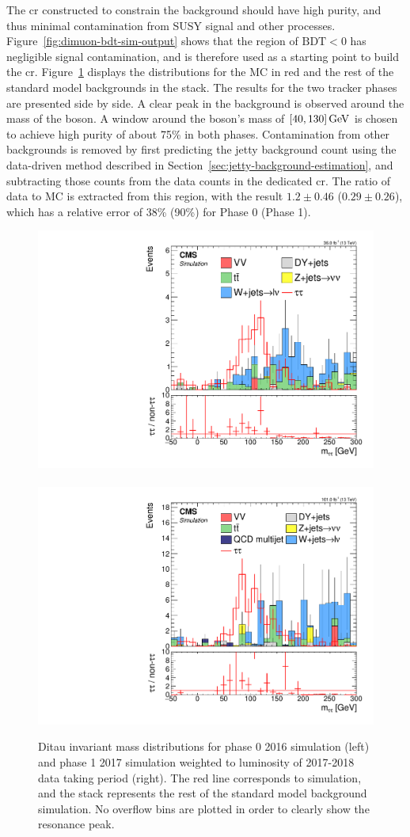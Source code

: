 The \gls{cr} constructed to constrain the \ztautau background should have high purity, and thus minimal contamination from SUSY signal and other processes. Figure~\ref{fig:dimuon-bdt-sim-output} shows that the region of $\text{BDT} < 0$ has negligible signal contamination, and is therefore used as a starting point to build the \tautau \gls{cr}. Figure~\ref{fig:mtautau-distributions} displays the \mtautau distributions for the \tautau MC in red and the rest of the standard model backgrounds in the stack. The results for the two tracker phases are presented side by side. A clear peak in the \tautau background is observed around the mass of the \PZ boson. A window around the \PZ boson's mass of $[40,130]\,\text{Ge\hspace{-.08em}V}$ is chosen to achieve high purity of about 75\% in both phases. Contamination from other backgrounds is removed by first predicting the jetty background count using the data-driven method described in Section~\ref{sec:jetty-background-estimation}, and subtracting those counts from the data counts in the \tautau dedicated \gls{cr}. The ratio of data to MC is extracted from this region, with the result $1.2\pm 0.46$ ($0.29\pm 0.26$), which has a relative error of 38\% (90\%) for Phase 0 (Phase 1).

\begin{figure}[!htb]
\centering
\includegraphics[width=0.48\linewidth]{plots/dilepton_muons_bg_isocr_scan_tautau_vs_no_tautau/bdt2_nmtautauCorrJetNoMultIso10Dr0.6.pdf} \,
\includegraphics[width=0.48\linewidth]{plots/dilepton_muons_bg_isocr_scan_tautau_vs_no_tautau_phase1/bdt_nmtautauCorrJetNoMultIso10Dr0.6.pdf} \\


\caption[Ditau invariant mass distibutions]{Ditau invariant mass \mtautau distributions for phase 0 2016 simulation (left) and phase 1 2017 simulation weighted to luminosity of 2017-2018 data taking period (right). The red line corresponds to \tautau simulation, and the stack represents the rest of the standard model background simulation. No overflow bins are plotted in order to clearly show the resonance peak.}
\label{fig:mtautau-distributions}
\end{figure}

